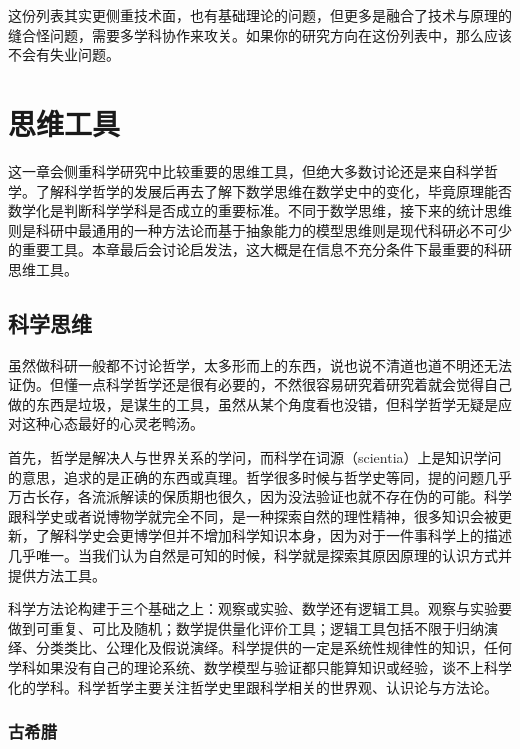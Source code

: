 \documentclass[]{tufte-book}
\begin{document}
这份列表其实更侧重技术面，也有基础理论的问题，但更多是融合了技术与原理的缝合怪问题，需要多学科协作来攻关。如果你的研究方向在这份列表中，那么应该不会有失业问题。

\hypertarget{thought}{%
\chapter{思维工具}\label{thought}}

这一章会侧重科学研究中比较重要的思维工具，但绝大多数讨论还是来自科学哲学。了解科学哲学的发展后再去了解下数学思维在数学史中的变化，毕竟原理能否数学化是判断科学学科是否成立的重要标准。不同于数学思维，接下来的统计思维则是科研中最通用的一种方法论而基于抽象能力的模型思维则是现代科研必不可少的重要工具。本章最后会讨论启发法，这大概是在信息不充分条件下最重要的科研思维工具。

\hypertarget{ux79d1ux5b66ux601dux7ef4}{%
\section{科学思维}\label{ux79d1ux5b66ux601dux7ef4}}

虽然做科研一般都不讨论哲学，太多形而上的东西，说也说不清道也道不明还无法证伪。但懂一点科学哲学还是很有必要的，不然很容易研究着研究着就会觉得自己做的东西是垃圾，是谋生的工具，虽然从某个角度看也没错，但科学哲学无疑是应对这种心态最好的心灵老鸭汤。

首先，哲学是解决人与世界关系的学问，而科学在词源（scientia）上是知识学问的意思，追求的是正确的东西或真理。哲学很多时候与哲学史等同，提的问题几乎万古长存，各流派解读的保质期也很久，因为没法验证也就不存在伪的可能。科学跟科学史或者说博物学就完全不同，是一种探索自然的理性精神，很多知识会被更新，了解科学史会更博学但并不增加科学知识本身，因为对于一件事科学上的描述几乎唯一。当我们认为自然是可知的时候，科学就是探索其原因原理的认识方式并提供方法工具。

科学方法论构建于三个基础之上：观察或实验、数学还有逻辑工具。观察与实验要做到可重复、可比及随机；数学提供量化评价工具；逻辑工具包括不限于归纳演绎、分类类比、公理化及假说演绎。科学提供的一定是系统性规律性的知识，任何学科如果没有自己的理论系统、数学模型与验证都只能算知识或经验，谈不上科学化的学科。科学哲学主要关注哲学史里跟科学相关的世界观、认识论与方法论。

\hypertarget{ux53e4ux5e0cux814a}{%
\subsection{古希腊}\label{ux53e4ux5e0cux814a}}
\end{document}
